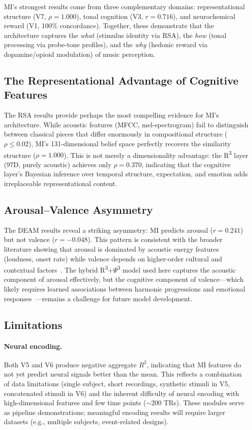 \documentclass[twocolumn,10pt]{article}
\newcommand{\rthree}{R\textsuperscript{3}}
\newcommand{\psithree}{\ensuremath{\Psi}\textsuperscript{3}}
\begin{document}
MI's strongest results come from three complementary domains: representational structure (V7, $\rho = 1.000$), tonal cognition (V3, $r = 0.716$), and neurochemical reward (V1, 100\% concordance). Together, these demonstrate that the architecture captures the \textit{what} (stimulus identity via RSA), the \textit{how} (tonal processing via probe-tone profiles), and the \textit{why} (hedonic reward via dopamine/opioid modulation) of music perception.

\subsection{The Representational Advantage of Cognitive Features}

The RSA results provide perhaps the most compelling evidence for MI's architecture. While acoustic features (MFCC, mel-spectrogram) fail to distinguish between classical pieces that differ enormously in compositional structure ($\rho \leq 0.02$), MI's 131-dimensional belief space perfectly recovers the similarity structure ($\rho = 1.000$). This is not merely a dimensionality advantage: the \rthree{} layer (97D, purely acoustic) achieves only $\rho = 0.370$, indicating that the cognitive layer's Bayesian inference over temporal structure, expectation, and emotion adds irreplaceable representational content.

\subsection{Arousal--Valence Asymmetry}

The DEAM results reveal a striking asymmetry: MI predicts arousal ($r = 0.241$) but not valence ($r = -0.048$). This pattern is consistent with the broader literature showing that arousal is dominated by acoustic energy features (loudness, onset rate) while valence depends on higher-order cultural and contextual factors~\citep{eerola2011, juslin2013}. The hybrid \rthree{}+\psithree{} model used here captures the acoustic component of arousal effectively, but the cognitive component of valence---which likely requires learned associations between harmonic progressions and emotional responses~\citep{juslin2010}---remains a challenge for future model development.

\subsection{Limitations}

\paragraph{Neural encoding.} Both V5 and V6 produce negative aggregate $R^2$, indicating that MI features do not yet predict neural signals better than the mean. This reflects a combination of data limitations (single subject, short recordings, synthetic stimuli in V5, concatenated stimuli in V6) and the inherent difficulty of neural encoding with high-dimensional features and few time points ($\sim$200 TRs). These modules serve as pipeline demonstrations; meaningful encoding results will require larger datasets (e.g., multiple subjects, event-related designs).
\end{document}
